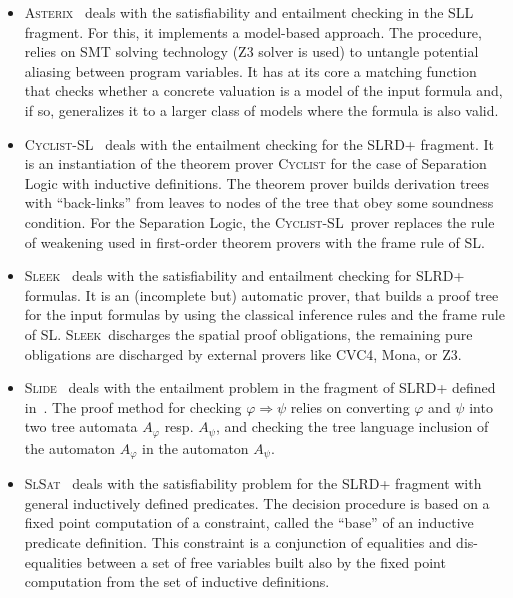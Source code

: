 \documentclass[twoside,11pt]{article}
\newcommand{\limp}{\Rightarrow}
\newcommand{\ASTERIX}{\textsc{Asterix}}
\newcommand{\CYCLIST}{\textsc{Cyclist-SL}}
\newcommand{\SLEEK}{\textsc{Sleek}}
\newcommand{\SLIDE}{\textsc{Slide}}
\newcommand{\SLSAT}{\textsc{SlSat}}
\begin{document}
\begin{itemize}
\item \ASTERIX~\cite{PerezR13} 
deals with the satisfiability and entailment checking in the SLL fragment.
For this, it implements a model-based approach.
The procedure, relies on SMT solving technology (Z3 solver is used) to untangle potential aliasing between program variables. 
It has at its core a matching function that checks whether a concrete valuation is a model of the input formula and, if so, generalizes it to a larger class of models where the formula is also valid.  


\item \CYCLIST~\cite{BrotherstonGP12}
deals with the entailment checking for the SLRD+ fragment.
It is an instantiation of the theorem prover \textsc{Cyclist} for the case of Separation Logic with inductive definitions. 
The theorem prover builds derivation trees with ``back-links'' from leaves to nodes of the tree that obey some soundness condition. 
For the Separation Logic, the \CYCLIST\ prover replaces the rule of weakening used in first-order theorem provers with the frame rule of SL.


\item \SLEEK~\cite{ChinDNQ12} 
deals with the satisfiability and entailment checking for SLRD+ formulas.
It is an (incomplete but) automatic prover, that builds a proof tree for the input formulas by using the classical inference rules and the frame rule of SL.
%
\SLEEK\ discharges the spatial proof obligations, the remaining pure obligations are discharged by external provers like CVC4, Mona, or Z3.


\item \SLIDE~\cite{IosifRV14} 
deals with the entailment problem in the fragment of SLRD+ defined in~\cite{IosifRS13}.
The proof method for checking $\varphi\limp\psi$ relies on converting $\varphi$ and $\psi$ into two tree automata $A_\varphi$ resp. $A_\psi$, and checking
the tree language inclusion of the automaton $A_\varphi$ in the automaton $A_\psi$.


\item \SLSAT~\cite{BrotherstonFPG14} 
deals with the satisfiability problem for the SLRD+ fragment with general inductively defined predicates.
The decision procedure is based on a fixed point computation of a constraint, called the ``base'' of an inductive predicate definition. This constraint is a conjunction of equalities and dis-equalities between a set of free variables built also by the fixed point computation from the set of inductive definitions.




\end{itemize}
\end{document}
